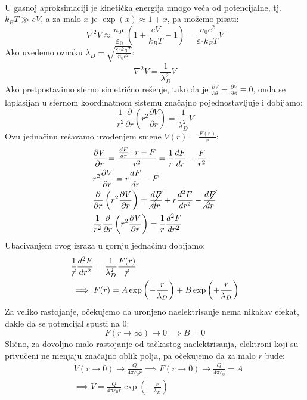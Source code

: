 \documentclass[fleqn]{report}
\begin{document}
\begin{enumerate}
\begin{align*}
          \end{align*}
          U gasnoj aproksimaciji je kinetička energija mnogo veća od potencijalne, tj. $k_B T \gg eV$, a za malo $x$ je $\exp(x) \approx 1 + x$, pa možemo pisati:
          \[ \nabla^2 V \approx \frac{n_0 e}{\varepsilon_0} \left(1 + \frac{eV}{k_B T} - 1\right) = \frac{n_0 e^2}{\varepsilon_0 k_B T} V \]
          Ako uvedemo oznaku $\lambda_D = \sqrt{\frac{\varepsilon_0 k_B T}{n_0 e^2}}$:
          \[ \nabla^2 V = \frac{1}{\lambda_D^2} V \]
          Ako pretpostavimo sferno simetrično rešenje, tako da je $\frac{\partial V}{\partial \theta} = \frac{\partial V}{\partial \phi} \equiv 0$, onda se laplasijan u sfernom koordinatnom sistemu značajno pojednostavljuje i dobijamo:
          \[ \frac{1}{r^2} \frac{\partial}{\partial r} \left(r^2 \frac{\partial V}{\partial r}\right) = \frac{1}{\lambda_D^2} V \]
          Ovu jednačinu rešavamo uvođenjem smene $V(r) = \frac{F(r)}{r}$:
          \begin{align*}
               & \frac{\partial V}{\partial r} = \frac{\frac{dF}{dr} \cdot r - F}{r^2} = \frac{1}{r}\frac{dF}{dr} - \frac{F}{r^2}                                  \\
               & r^2 \frac{\partial V}{\partial r} = r\frac{dF}{dr} - F                                                                                            \\
               & \frac{\partial}{\partial r} \left(r^2 \frac{\partial V}{\partial r}\right) = \cancel{\frac{dF}{dr}} + r\frac{d^2F}{dr^2} - \cancel{\frac{dF}{dr}} \\
               & \frac{1}{r^2}\frac{\partial}{\partial r} \left(r^2 \frac{\partial V}{\partial r}\right) = \frac{1}{r}\frac{d^2F}{dr^2}
          \end{align*}
          Ubacivanjem ovog izraza u gornju jednačinu dobijamo:
          \begin{align*}
               & \frac{1}{\cancel{r}}\frac{d^2F}{dr^2} = \frac{1}{\lambda_D^2} \frac{F(r)}{\cancel{r}}           \\
               & \implies F(r) = A\exp\left(-\frac{r}{\lambda_D}\right) + B\exp\left(+\frac{r}{\lambda_D}\right)
          \end{align*}
          Za veliko rastojanje, očekujemo da uronjeno naelektrisanje nema nikakav efekat, dakle da se potencijal spusti na 0:
          \[ F(r \to \infty) \to 0 \implies B = 0 \]
          Slično, za dovoljno malo rastojanje od tačkastog naelektrisanja, elektroni koji su privučeni ne menjaju značajno oblik polja, pa očekujemo da za malo $r$ bude:
          \begin{align*}
               & V(r \to 0) \to \frac{Q}{4\pi\varepsilon_0 r} \implies F(r \to 0) \to \frac{Q}{4\pi\varepsilon_0} = A \\
               & \implies V = \frac{Q}{4\pi\varepsilon_0 r} \exp\left(-\frac{r}{\lambda_D}\right)
          \end{align*}


\end{enumerate}
\end{document}
